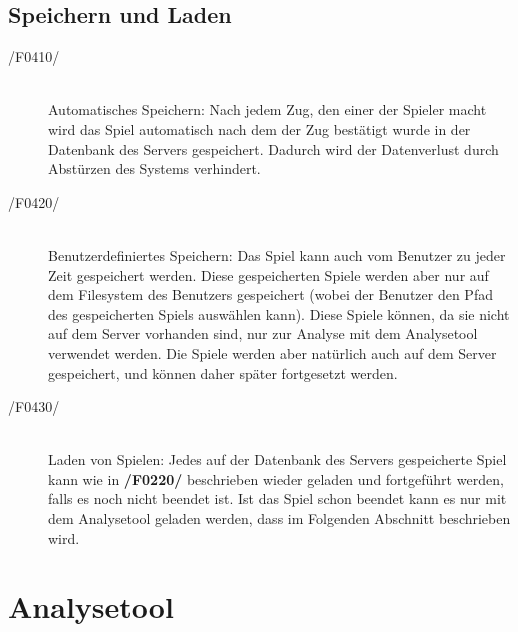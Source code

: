\subsection{Speichern und Laden}

\begin{description}
	\item[/F0410/]~\\
		Automatisches Speichern: Nach jedem Zug, den einer der Spieler macht wird das Spiel automatisch nach dem der Zug bestätigt wurde in der Datenbank des Servers gespeichert. Dadurch wird der Datenverlust durch Abstürzen des Systems verhindert.
	\item[/F0420/]~\\
		Benutzerdefiniertes Speichern: Das Spiel kann auch vom Benutzer zu jeder Zeit gespeichert werden. Diese gespeicherten Spiele werden aber nur auf dem Filesystem des Benutzers gespeichert (wobei der Benutzer den Pfad des gespeicherten Spiels auswählen kann). Diese Spiele können, da sie nicht auf dem Server vorhanden sind, nur zur Analyse mit dem Analysetool verwendet werden. Die Spiele werden aber natürlich auch auf dem Server gespeichert, und können daher später fortgesetzt werden.
	\item[/F0430/]~\\
		Laden von Spielen: Jedes auf der Datenbank des Servers gespeicherte Spiel kann wie in \textbf{/F0220/} beschrieben wieder geladen und fortgeführt werden, falls es noch nicht beendet ist. Ist das Spiel schon beendet kann es nur mit dem Analysetool geladen werden, dass im Folgenden Abschnitt beschrieben wird.
\end{description}

\section{Analysetool}

